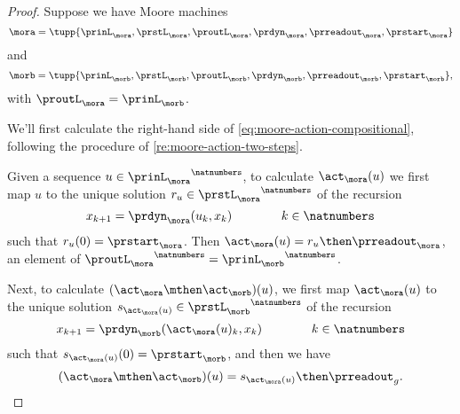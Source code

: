\begin{proof}
Suppose we have Moore machines 
\begin{equation}
    \label{eq:moore-mora-3rd}
    \mora = \tupp{\prinL_{\mora},\prstL_{\mora},\proutL_{\mora},\prdyn_{\mora},\prreadout_{\mora},\prstart_{\mora}}
\end{equation}
%
and
%
\begin{equation}
    \label{eq:moore-morb-3rd}
    \morb = \tupp{\prinL_{\morb},\prstL_{\morb},\proutL_{\morb},\prdyn_{\morb},\prreadout_{\morb},\prstart_{\morb}},
\end{equation}
with $\proutL_\mora = \prinL_\morb$. 

We'll first calculate the right-hand side of \cref{eq:moore-action-compositional}, following the procedure of \cref{re:moore-action-two-steps}. 

Given a sequence $u \in {\prinL_{\mora}}^\natnumbers$, to calculate $\act_\mora(u)$ we first map $u$ to the unique solution $r_u \in {\prstL_{\mora}}^\natnumbers$ of the recursion
\begin{equation}
        x_{k+1} = \prdyn_\mora(u_k, x_k)  \qquad \qquad k \in \natnumbers
\end{equation}
such that $r_u(0) = \prstart_{\mora}$. Then $\act_\mora(u) = r_u \then \prreadout_\mora$, an element of ${\proutL_{\mora}}^\natnumbers = {\prinL_{\morb}}^\natnumbers$.

Next, to calculate $(\act_\mora \mthen \act_\morb)(u)$, we first map $\act_\mora(u)$ to the unique solution $s_{\act_\mora(u)} \in {\prstL_{\morb}}^\natnumbers$ of the recursion 
\begin{equation}
        x_{k+1} = \prdyn_\morb(\act_\mora(u)_k, x_k)  \qquad \qquad k \in \natnumbers
\end{equation}
such that $s_{\act_\mora(u)}(0) = \prstart_{\morb}$, and then we have
\begin{equation}
\label{eq:Moore-act-composition-1}
(\act_\mora \mthen \act_\morb)(u) = s_{\act_\mora(u)} \then \prreadout_g.
\end{equation}


\end{proof}
